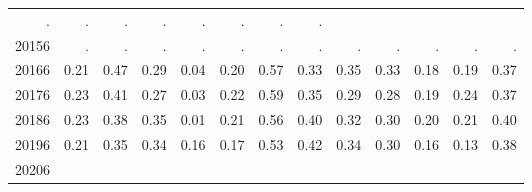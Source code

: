 \begin{table}[!h]
\begin{tabular}{lllllllllllll}
  \multicolumn{1}{r}{.} &
  \multicolumn{1}{r}{.} &
  \multicolumn{1}{r}{.} &
  \multicolumn{1}{r}{.} &
  \multicolumn{1}{r}{.} &
  \multicolumn{1}{r}{.} &
  \multicolumn{1}{r}{.} &
  \multicolumn{1}{r}{.} \\
\multicolumn{1}{l}{\hspace{1em}20156} &
  \multicolumn{1}{|r}{.} &
  \multicolumn{1}{r}{.} &
  \multicolumn{1}{r}{.} &
  \multicolumn{1}{r}{.} &
  \multicolumn{1}{r}{.} &
  \multicolumn{1}{r}{.} &
  \multicolumn{1}{r}{.} &
  \multicolumn{1}{r}{.} &
  \multicolumn{1}{r}{.} &
  \multicolumn{1}{r}{.} &
  \multicolumn{1}{r}{.} &
  \multicolumn{1}{r}{.} \\
\multicolumn{1}{l}{\hspace{1em}20166} &
  \multicolumn{1}{|r}{0.21} &
  \multicolumn{1}{r}{0.47} &
  \multicolumn{1}{r}{0.29} &
  \multicolumn{1}{r}{0.04} &
  \multicolumn{1}{r}{0.20} &
  \multicolumn{1}{r}{0.57} &
  \multicolumn{1}{r}{0.33} &
  \multicolumn{1}{r}{0.35} &
  \multicolumn{1}{r}{0.33} &
  \multicolumn{1}{r}{0.18} &
  \multicolumn{1}{r}{0.19} &
  \multicolumn{1}{r}{0.37} \\
\multicolumn{1}{l}{\hspace{1em}20176} &
  \multicolumn{1}{|r}{0.23} &
  \multicolumn{1}{r}{0.41} &
  \multicolumn{1}{r}{0.27} &
  \multicolumn{1}{r}{0.03} &
  \multicolumn{1}{r}{0.22} &
  \multicolumn{1}{r}{0.59} &
  \multicolumn{1}{r}{0.35} &
  \multicolumn{1}{r}{0.29} &
  \multicolumn{1}{r}{0.28} &
  \multicolumn{1}{r}{0.19} &
  \multicolumn{1}{r}{0.24} &
  \multicolumn{1}{r}{0.37} \\
\multicolumn{1}{l}{\hspace{1em}20186} &
  \multicolumn{1}{|r}{0.23} &
  \multicolumn{1}{r}{0.38} &
  \multicolumn{1}{r}{0.35} &
  \multicolumn{1}{r}{0.01} &
  \multicolumn{1}{r}{0.21} &
  \multicolumn{1}{r}{0.56} &
  \multicolumn{1}{r}{0.40} &
  \multicolumn{1}{r}{0.32} &
  \multicolumn{1}{r}{0.30} &
  \multicolumn{1}{r}{0.20} &
  \multicolumn{1}{r}{0.21} &
  \multicolumn{1}{r}{0.40} \\
\multicolumn{1}{l}{\hspace{1em}20196} &
  \multicolumn{1}{|r}{0.21} &
  \multicolumn{1}{r}{0.35} &
  \multicolumn{1}{r}{0.34} &
  \multicolumn{1}{r}{0.16} &
  \multicolumn{1}{r}{0.17} &
  \multicolumn{1}{r}{0.53} &
  \multicolumn{1}{r}{0.42} &
  \multicolumn{1}{r}{0.34} &
  \multicolumn{1}{r}{0.30} &
  \multicolumn{1}{r}{0.16} &
  \multicolumn{1}{r}{0.13} &
  \multicolumn{1}{r}{0.38} \\
\multicolumn{1}{l}{\hspace{1em}20206} &

\end{tabular}
\end{table}
